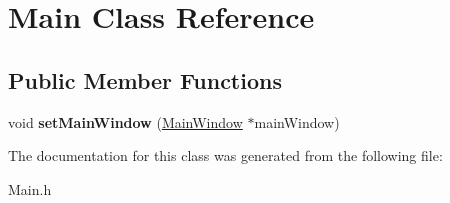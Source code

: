 \hypertarget{classMain}{}\section{Main Class Reference}
\label{classMain}
\subsection*{Public Member Functions}
\begin{DoxyCompactItemize}
\item 
\mbox{\label{classMain_aa058b586d5d94b090932e206e5dc76d7}} 
void {\bfseries set\+Main\+Window} (\hyperlink{classMainWindow}{Main\+Window} $\ast$main\+Window)
\end{DoxyCompactItemize}


The documentation for this class was generated from the following file\+:\begin{DoxyCompactItemize}
\item 
Main.\+h\end{DoxyCompactItemize}
